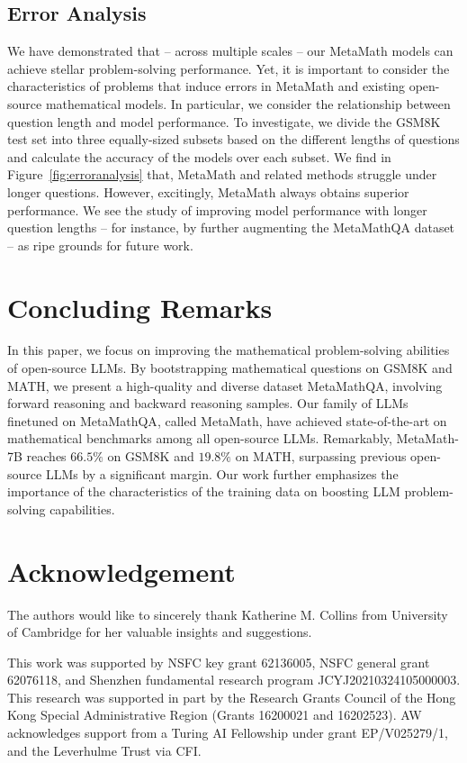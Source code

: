 \vspace{2mm}
\subsection{Error Analysis}
\vspace{-1mm}

We have demonstrated that -- across multiple scales -- our MetaMath models can achieve stellar problem-solving performance. Yet, it is important to consider the characteristics of problems that induce errors in MetaMath and existing open-source mathematical models. In particular, we consider the relationship between question length and model performance. To investigate, we divide the GSM8K test set into three equally-sized subsets based on the different lengths of questions and calculate the accuracy of the models over each subset. We find in Figure~\ref{fig:erroranalysis} that, MetaMath and related methods struggle under longer questions. However, excitingly, MetaMath always obtains superior performance. We see the study of improving model performance with longer question lengths -- for instance, by further augmenting the MetaMathQA dataset -- as ripe grounds for future work. 
\vspace{-.5mm}
	

\section{Concluding Remarks}
\label{sec:conclusion}

 \vspace{-1mm}
 In this paper, we focus on improving the mathematical problem-solving abilities of open-source LLMs. By bootstrapping mathematical questions on GSM8K and MATH, we present a high-quality and diverse dataset {MetaMathQA}, involving forward reasoning and backward reasoning samples. Our family of LLMs finetuned on {MetaMathQA}, called {MetaMath}, have achieved state-of-the-art on mathematical benchmarks among all open-source LLMs. Remarkably, {MetaMath-7B} reaches $66.5\%$ on GSM8K and $19.8\%$ on MATH, surpassing previous open-source LLMs by a significant margin. Our work further emphasizes the importance of the characteristics of the training data on boosting LLM problem-solving capabilities.

\newpage

\section*{Acknowledgement}
The authors would like to sincerely thank Katherine M. Collins from University of Cambridge for her valuable insights and suggestions.

This work was supported by NSFC key grant 62136005,
NSFC general grant 62076118, and Shenzhen fundamental research program JCYJ20210324105000003. This research was supported in part by the Research Grants Council
of the Hong Kong Special Administrative Region (Grants
16200021 and 16202523). AW acknowledges support from a Turing AI Fellowship under grant EP/V025279/1, and the Leverhulme Trust via CFI. 
	
 
 \clearpage
 \newpage

